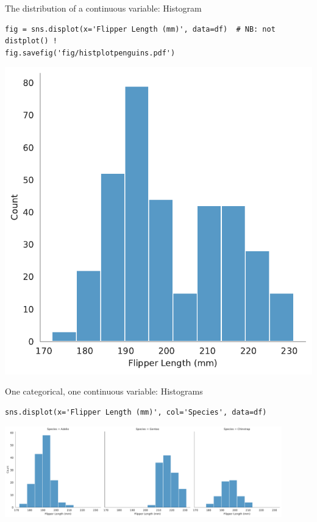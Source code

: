 \documentclass[aspectratio=169,usenames,dvipsnames]{beamer}
\begin{document}
\begin{frame}[fragile]{The distribution of a continuous variable: Histogram}
\begin{lstlisting}
fig = sns.displot(x='Flipper Length (mm)', data=df)  # NB: not distplot() !
fig.savefig('fig/histplotpenguins.pdf')
\end{lstlisting}

\includegraphics[height=0.7\textheight]{fig/histplotpenguins}
\end{frame}


\begin{frame}[fragile]{One categorical, one continuous variable: Histograms}
\begin{lstlisting}
sns.displot(x='Flipper Length (mm)', col='Species', data=df)
\end{lstlisting}

\includegraphics[width=0.9\textwidth]{fig/histplotpenguins1}
\end{frame}
\end{document}
